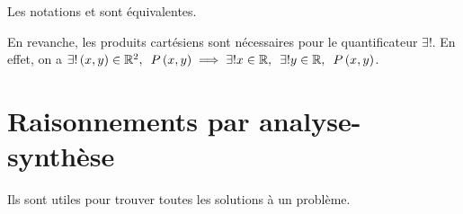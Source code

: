 \begin{rem}
Les notations  et  sont équivalentes.

En revanche, les produits cartésiens sont nécessaires pour le quantificateur \(\exists!\). En effet, on a \(\quantifs{\exists!\paren{x,y}\in\R^2}P\paren{x,y}\imp\quantifs{\exists! x\in\R;\exists! y\in\R}P\paren{x,y}\).
\end{rem}

\section{Raisonnements par analyse-synthèse}

Ils sont utiles pour trouver toutes les solutions à un problème.

